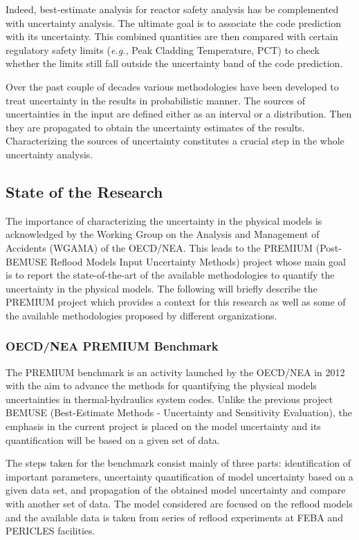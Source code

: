 \documentclass[11pt,titlepage]{article}
\begin{document}
Indeed, best-estimate analysis for reactor safety analysis has be complemented with uncertainty analysis. The ultimate goal is to associate the code prediction with its uncertainty. This combined quantities are then compared with certain regulatory safety limits (\textit{e.g.,} Peak Cladding Temperature, PCT) to check whether the limits still fall outside the uncertainty band of the code prediction.
 
Over the past couple of decades various methodologies have been developed to treat uncertainty in the results in probabilistic manner. The sources of uncertainties in the input are defined either as an interval or a distribution. Then they are propagated to obtain the uncertainty estimates of the results. Characterizing the sources of uncertainty constitutes a crucial step in the whole uncertainty analysis.   

\subsection{State of the Research}

The importance of characterizing the uncertainty in the physical models is acknowledged by the Working Group on the Analysis and Management of Accidents (WGAMA) of the OECD/NEA. This leads to the PREMIUM (Post-BEMUSE Reflood Models Input Uncertainty Methods) project whose main goal is to report the state-of-the-art of the available methodologies to quantify the uncertainty in the physical models. The following will briefly describe the PREMIUM project which provides a context for this research as well as some of the available methodologies proposed by different organizations.

\subsubsection{OECD/NEA PREMIUM Benchmark}

The PREMIUM benchmark is an activity launched by the OECD/NEA in 2012 with the aim to advance the methods for quantifying the physical models uncertainties in thermal-hydraulics system codes. Unlike the previous project BEMUSE (Best-Estimate Methods - Uncertainty and Sensitivity Evaluation), the emphasis in the current project is placed on the model uncertainty and its quantification will be based on a given set of data.

The steps taken for the benchmark consist mainly of three parts: identification of important parameters, uncertainty quantification of model uncertainty based on a given data set, and propagation of the obtained model uncertainty and compare with another set of data. The model considered are focused on the reflood models and the available data is taken from series of reflood experiments at FEBA and PERICLES facilities.
\end{document}
